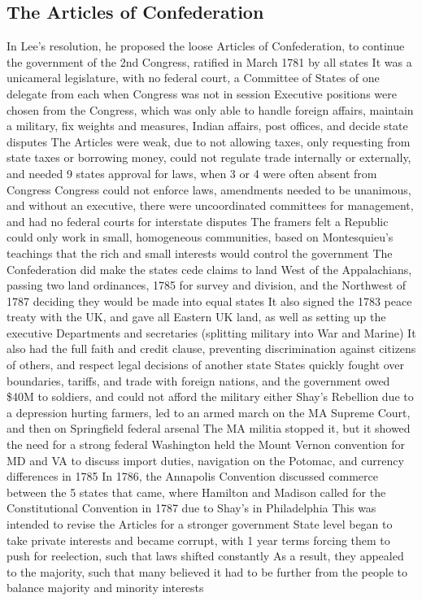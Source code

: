 \documentclass[11 pt, twoside]{article}
\newenvironment{outline*}
{
	\begin{outline}[enumerate]
	}
	{\end{outline}
}
\begin{document}
\subsection{The Articles of Confederation}
\begin{outline*}
\1 In Lee’s resolution, he proposed the loose Articles of Confederation, to continue the government of the 2nd Congress, ratified in March 1781 by all states
\2 It was a unicameral legislature, with no federal court, a Committee of States of one delegate from each when Congress was not in session
\2 Executive positions were chosen from the Congress, which was only able to handle foreign affairs, maintain a military, fix weights and measures, Indian affairs, post offices, and decide state disputes
\1 The Articles were weak, due to not allowing taxes, only requesting from state taxes or borrowing money, could not regulate trade internally or externally, and needed 9 states approval for laws, when 3 or 4 were often absent from Congress
\2 Congress could not enforce laws, amendments needed to be unanimous, and without an executive, there were uncoordinated committees for management, and had no federal courts for interstate disputes
\2 The framers felt a Republic could only work in small, homogeneous communities, based on Montesquieu's teachings that the rich and small interests would control the government
\1 The Confederation did make the states cede claims to land West of the Appalachians, passing two land ordinances, 1785 for survey and division, and the Northwest of 1787 deciding they would be made into equal states
\2 It also signed the 1783 peace treaty with the UK, and gave all Eastern UK land, as well as setting up the executive Departments and secretaries (splitting military into War and Marine)
\2 It also had the full faith and credit clause, preventing discrimination against citizens of others, and respect legal decisions of another state
\1 States quickly fought over boundaries, tariffs, and trade with foreign nations, and the government owed \$40M to soldiers, and could not afford the military either
\2 Shay’s Rebellion due to a depression hurting farmers, led to an armed march on the MA Supreme Court, and then on Springfield federal arsenal
\2 The MA militia stopped it, but it showed the need for a strong federal
\1 Washington held the Mount Vernon convention for MD and VA to discuss import duties, navigation on the Potomac, and currency differences in 1785
\2 In 1786, the Annapolis Convention discussed commerce between the 5 states that came, where Hamilton and Madison called for the Constitutional Convention in 1787 due to Shay’s in Philadelphia
\2 This was intended to revise the Articles for a stronger government
\1 State level began to take private interests and became corrupt, with 1 year terms forcing them to push for reelection, such that laws shifted constantly
\2 As a result, they appealed to the majority, such that many believed it had to be further from the people to balance majority and minority interests
\end{outline*}
\end{document}
